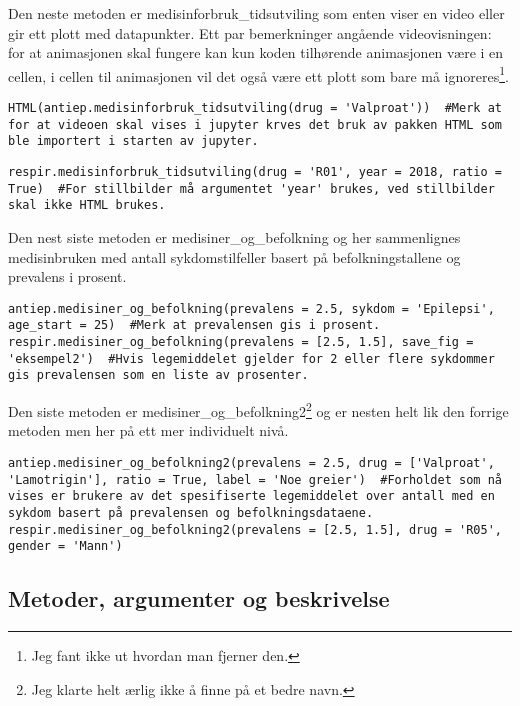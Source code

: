 \documentclass[12pt,norsk,a4paper,fleqn]{article}
\numberwithin{equation}{section}
\begin{document}
Den neste metoden er {\color{blue}medisinforbruk\_tidsutviling} som enten viser en video eller gir ett plott med datapunkter. Ett par bemerkninger angående videovisningen: for at animasjonen skal fungere kan kun koden tilhørende animasjonen være i en cellen, i cellen til animasjonen vil det også være ett plott som bare må ignoreres\footnote{Jeg fant ikke ut hvordan man fjerner den.}.
\begin{lstlisting}
HTML(antiep.medisinforbruk_tidsutviling(drug = 'Valproat'))  #Merk at for at videoen skal vises i jupyter krves det bruk av pakken HTML som ble importert i starten av jupyter.
\end{lstlisting}
\begin{lstlisting}
respir.medisinforbruk_tidsutviling(drug = 'R01', year = 2018, ratio = True)  #For stillbilder må argumentet 'year' brukes, ved stillbilder skal ikke HTML brukes.
\end{lstlisting}
Den nest siste metoden er {\color{blue}medisiner\_og\_befolkning} og her sammenlignes medisinbruken med antall sykdomstilfeller basert på befolkningstallene og prevalens i prosent.
\begin{lstlisting}
antiep.medisiner_og_befolkning(prevalens = 2.5, sykdom = 'Epilepsi', age_start = 25)  #Merk at prevalensen gis i prosent.
respir.medisiner_og_befolkning(prevalens = [2.5, 1.5], save_fig = 'eksempel2')  #Hvis legemiddelet gjelder for 2 eller flere sykdommer gis prevalensen som en liste av prosenter.
\end{lstlisting}
Den siste metoden er {\color{blue}medisiner\_og\_befolkning2}\footnote{Jeg klarte helt ærlig ikke å finne på et bedre navn.} og er nesten helt lik den forrige metoden men her på ett mer individuelt nivå.
\begin{lstlisting}
antiep.medisiner_og_befolkning2(prevalens = 2.5, drug = ['Valproat', 'Lamotrigin'], ratio = True, label = 'Noe greier')  #Forholdet som nå vises er brukere av det spesifiserte legemiddelet over antall med en sykdom basert på prevalensen og befolkningsdataene.
respir.medisiner_og_befolkning2(prevalens = [2.5, 1.5], drug = 'R05', gender = 'Mann')
\end{lstlisting}
\newpage

\subsection{Metoder, argumenter og beskrivelse}
\end{document}
